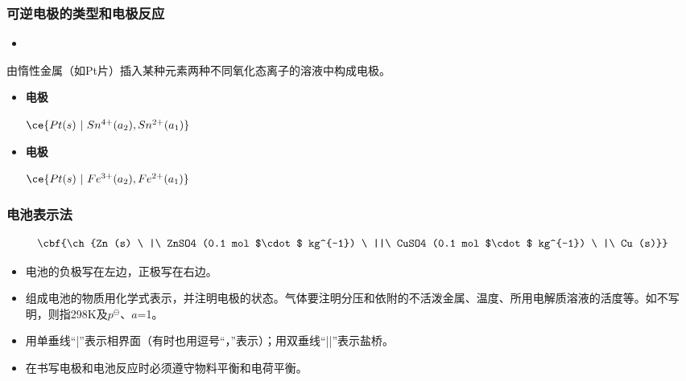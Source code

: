 \documentclass[dvipsnames, svgnames, x11names]{beamer}
\begin{document}
	
	\begin{frame}
		\frametitle{可逆电极的类型和电极反应}
		\begin{itemize}
			\item[4.]  
		\end{itemize}
		由惰性金属（如Pt片）插入某种元素两种不同氧化态离子的溶液中构成电极。
		\begin{itemize}
			\item \bf{电极}
			
			$\ce{Pt(s) \ |\  Sn^{4+}(a_2),Sn^{2+}(a_1)}$ \qquad {}
			\item \bf{电极}
			
			$\ce{Pt(s) \ |\  Fe^{3+}(a_2),Fe^{2+}(a_1)}$ \qquad {}
		\end{itemize}
		
	\end{frame}
	
	
	\begin{frame}
		\frametitle{电池表示法}
		\[
			\cbf{\ch{Zn (s) \ |\  ZnSO4 (0.1 mol $\cdot$ kg^{-1}) \ ||\  CuSO4 (0.1 mol $\cdot$ kg^{-1}) \ |\  Cu (s)}}
		\]
		\begin{itemize}
			\item 电池的负极写在左边，正极写在右边。
			\item 组成电池的物质用化学式表示，并注明电极的状态。气体要注明分压和依附的不活泼金属、温度、所用电解质溶液的活度等。如不写明，则指298K及$p^\ominus$、$a$=1。
			\item 用单垂线“|”表示相界面（有时也用逗号“，”表示）；用双垂线“||”表示盐桥。
			\item 在书写电极和电池反应时必须遵守物料平衡和电荷平衡。
		\end{itemize}
	
	\end{frame}
	
\end{document}

